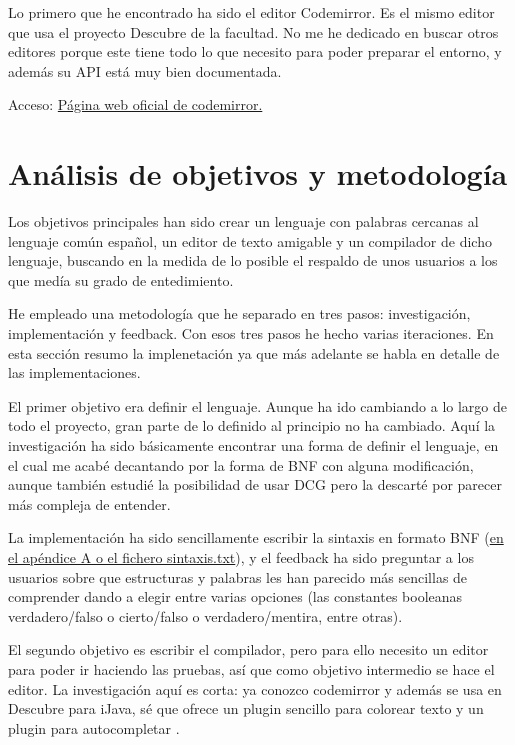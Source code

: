 \documentclass{report}
\begin{document}
	Lo primero que he encontrado ha sido el editor Codemirror. Es el mismo editor que usa el proyecto Descubre de la facultad. No me he dedicado en buscar otros editores porque este tiene
	todo lo que necesito para poder preparar el entorno, y además su API está muy bien documentada\cite{codemirrorapi}.
	
	Acceso:
	\href{http://codemirror.net/}{Página web oficial de codemirror.}
	
	\chapter{Análisis de objetivos y metodología}
	
	Los objetivos principales han sido crear un lenguaje con palabras cercanas al lenguaje común español, un editor de texto amigable y un compilador de dicho lenguaje, buscando en la medida de lo posible el respaldo de unos usuarios a los que medía su grado de entedimiento.
	
	\vspace{10px}
	
	He empleado una metodología que he separado en tres pasos: investigación, implementación y feedback. Con esos tres pasos he hecho varias iteraciones. En esta sección resumo la implenetación ya que más adelante se habla en detalle de las implementaciones.
	
	\vspace{10px}
	
	El primer objetivo era definir el lenguaje. Aunque ha ido cambiando a lo largo de todo el proyecto, gran parte de lo definido al principio no ha cambiado. Aquí la investigación ha sido básicamente encontrar una forma de definir el lenguaje, en el cual me acabé decantando por la forma de BNF\cite{bnf} con alguna modificación, aunque también estudié la posibilidad de usar DCG\cite{dcg} pero la descarté por parecer más compleja de entender. 
	
	La implementación ha sido sencillamente escribir la sintaxis en formato BNF (\hyperref[app:a]{en el apéndice A o el fichero sintaxis.txt}), y el feedback ha sido preguntar a los usuarios sobre que estructuras y palabras les han parecido más sencillas de comprender dando a elegir entre varias opciones (las constantes booleanas verdadero/falso o cierto/falso o verdadero/mentira, entre otras).
	
	\vspace{10px}
	
	El segundo objetivo es escribir el compilador, pero para ello necesito un editor para poder ir haciendo las pruebas, así que como objetivo intermedio se hace el editor. La investigación aquí es corta: ya conozco codemirror y además se usa en Descubre para iJava, sé que ofrece un plugin sencillo para colorear texto\cite{codemirrorsyntaxhighlight} y un plugin para autocompletar \cite{codemirrorautocomplete}. 
	
\end{document}
